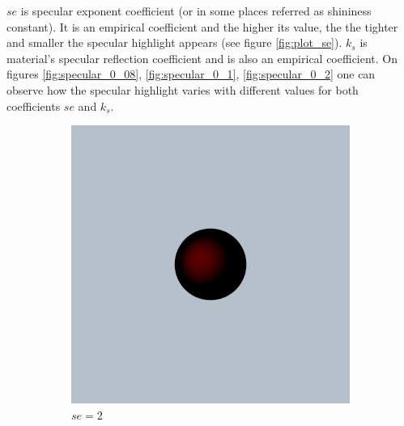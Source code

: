 \documentclass{article}
\begin{document}
$se$ is specular exponent coefficient (or in some places referred as shininess constant). It is an empirical coefficient and the higher its value, the the tighter and smaller the specular highlight appears (see figure \ref{fig:plot_se}).
$k_{s}$ is material's specular reflection coefficient and is also an empirical coefficient. On figures \ref{fig:specular_0_08}, \ref{fig:specular_0_1}, \ref{fig:specular_0_2} one can observe how the specular highlight varies with different values for both coefficients $se$ and $k_{s}$. 

\begin{figure}[h]
	\centering
	\begin{subfigure}{0.2\textwidth}
		\includegraphics[width=\textwidth]{specular_sc_0_08_se_2}
		\caption{$se = 2$}
		\label{fig:specular_0_08_2}
	\end{subfigure}%
	\hfill
	\begin{subfigure}{0.2\textwidth}

\end{subfigure}
\end{figure}
\end{document}
